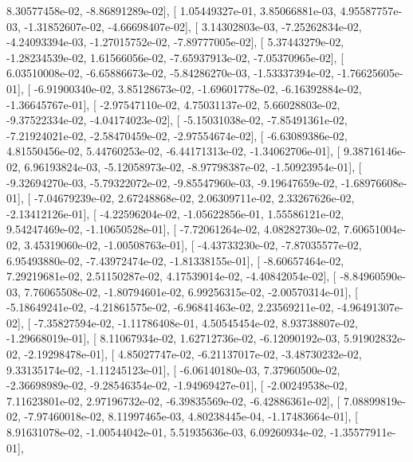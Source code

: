 \documentclass{article}
\begin{document}
          8.30577458e-02,  -8.86891289e-02],
       [  1.05449327e-01,   3.85066881e-03,   4.95587757e-03,
         -1.31852607e-02,  -4.66698407e-02],
       [  3.14302803e-03,  -7.25262834e-02,  -4.24093394e-03,
         -1.27015752e-02,  -7.89777005e-02],
       [  5.37443279e-02,  -1.28234539e-02,   1.61566056e-02,
         -7.65937913e-02,  -7.05370965e-02],
       [  6.03510008e-02,  -6.65886673e-02,  -5.84286270e-03,
         -1.53337394e-02,  -1.76625605e-01],
       [ -6.91900340e-02,   3.85128673e-02,  -1.69601778e-02,
         -6.16392884e-02,  -1.36645767e-01],
       [ -2.97547110e-02,   4.75031137e-02,   5.66028803e-02,
         -9.37522334e-02,  -4.04174023e-02],
       [ -5.15031038e-02,  -7.85491361e-02,  -7.21924021e-02,
         -2.58470459e-02,  -2.97554674e-02],
       [ -6.63089386e-02,   4.81550456e-02,   5.44760253e-02,
         -6.44171313e-02,  -1.34062706e-01],
       [  9.38716146e-02,   6.96193824e-03,  -5.12058973e-02,
         -8.97798387e-02,  -1.50923954e-01],
       [ -9.32694270e-03,  -5.79322072e-02,  -9.85547960e-03,
         -9.19647659e-02,  -1.68976608e-01],
       [ -7.04679239e-02,   2.67248868e-02,   2.06309711e-02,
          2.33267626e-02,  -2.13412126e-01],
       [ -4.22596204e-02,  -1.05622856e-01,   1.55586121e-02,
          9.54247469e-02,  -1.10650528e-01],
       [ -7.72061264e-02,   4.08282730e-02,   7.60651004e-02,
          3.45319060e-02,  -1.00508763e-01],
       [ -4.43733230e-02,  -7.87035577e-02,   6.95493880e-02,
         -7.43972474e-02,  -1.81338155e-01],
       [ -8.60657464e-02,   7.29219681e-02,   2.51150287e-02,
          4.17539014e-02,  -4.40842054e-02],
       [ -8.84960590e-03,   7.76065508e-02,  -1.80794601e-02,
          6.99256315e-02,  -2.00570314e-01],
       [ -5.18649241e-02,  -4.21861575e-02,  -6.96841463e-02,
          2.23569211e-02,  -4.96491307e-02],
       [ -7.35827594e-02,  -1.11786408e-01,   4.50545454e-02,
          8.93738807e-02,  -1.29668019e-01],
       [  8.11067934e-02,   1.62712736e-02,  -6.12090192e-03,
          5.91902832e-02,  -2.19298478e-01],
       [  4.85027747e-02,  -6.21137017e-02,  -3.48730232e-02,
          9.33135174e-02,  -1.11245123e-01],
       [ -6.06140180e-03,   7.37960500e-02,  -2.36698989e-02,
         -9.28546354e-02,  -1.94969427e-01],
       [ -2.00249538e-02,   7.11623801e-02,   2.97196732e-02,
         -6.39835569e-02,  -6.42886361e-02],
       [  7.08899819e-02,  -7.97460018e-02,   8.11997465e-03,
          4.80238445e-04,  -1.17483664e-01],
       [  8.91631078e-02,  -1.00544042e-01,   5.51935636e-03,
          6.09260934e-02,  -1.35577911e-01],
\end{document}
